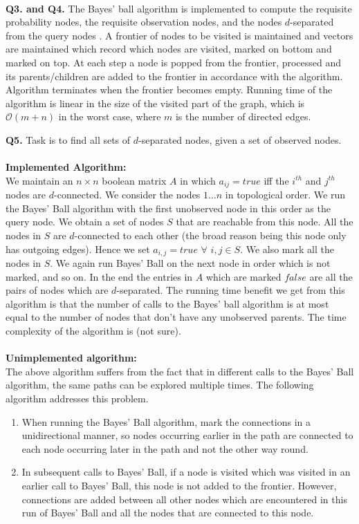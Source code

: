 \documentclass[]{article}
\begin{document}
\\
\par \noindent
{{\bfseries Q3. and Q4.}} The Bayes' ball algorithm is implemented to compute the requisite probability nodes, the requisite observation nodes, and the nodes $d$-separated from the query nodes . A frontier of nodes to be visited is maintained and vectors are maintained which record which nodes are visited, marked on bottom and marked on top. At each step a node is popped from the frontier, processed and its parents/children are added to the frontier in accordance with the algorithm. Algorithm terminates when the frontier becomes empty. Running time of the algorithm is linear in the size of the visited part of the graph, which is $\mathcal{O}(m+n)$ in the worst case, where $m$ is the number of directed edges.
\\
\par \noindent
{{\bfseries Q5.}} Task is to find all sets of $d$-separated nodes, given a set of observed nodes. \\\\ {\bfseries Implemented Algorithm:} \\ We maintain an $n \times n$ boolean matrix $A$ in which $a_{ij} = true$ iff the $i^{th}$ and $j^{th}$ nodes are $d$-connected. We consider the nodes $1 \ldots n$ in topological order. We run the Bayes' Ball algorithm with the first unobserved node in this order as the query node. We obtain a set of nodes $S$ that are reachable from this node. All the nodes in $S$ are $d$-connected to each other (the broad reason being this node only has outgoing edges). Hence we set $a_{i,j} = true$ $ \forall$ $i,j \in S$. We also mark all the nodes in $S$. We again run Bayes' Ball on the next node in order which is not marked, and so on. In the end the entries in $A$ which are marked $false$ are all the pairs of nodes which are $d$-separated. The running time benefit we get from this algorithm is that the number of calls to the Bayes' ball algorithm is at most equal to the number of nodes that don't have any unobserved parents. The time complexity of the algorithm is (not sure).
\\
\\{\bfseries Unimplemented algorithm:} \\ The above algorithm suffers from the fact that in different calls to the Bayes' Ball algorithm, the same paths can be explored multiple times. The following algorithm addresses this problem. \\
\begin{enumerate}[leftmargin=*]
\item When running the Bayes' Ball algorithm, mark the connections in a unidirectional manner, so nodes occurring earlier in the path are connected to each node occurring later in the path and not the other way round.
\item In subsequent calls to Bayes' Ball, if a node is visited which was visited in an earlier call to Bayes' Ball, this node is not added to the frontier. However, connections are added between all other nodes which are encountered in this run of Bayes' Ball and all the nodes that are connected to this node. 
\end{enumerate}
\end{document}
